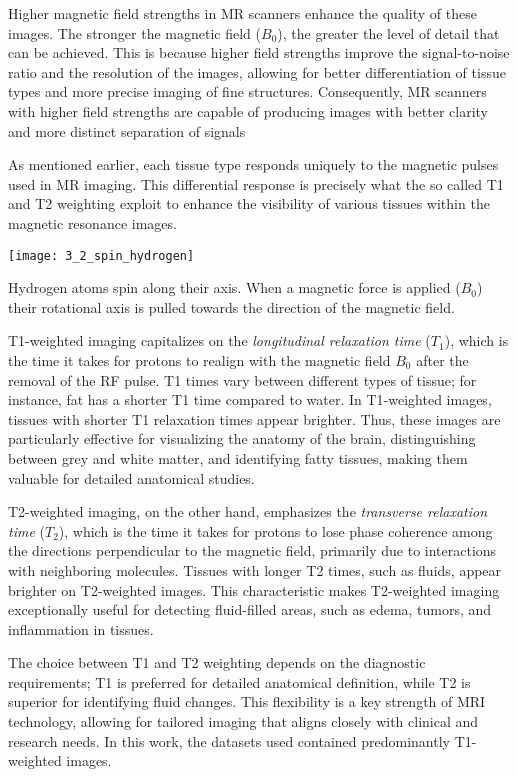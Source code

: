 Higher magnetic field strengths in MR scanners enhance the quality of these
images. The stronger the magnetic field ($B_0$), the greater the level of detail
that can be achieved. This is because higher field strengths improve the
signal-to-noise ratio and the resolution of the images, allowing for better
differentiation of tissue types and more precise imaging of fine structures.
Consequently, MR scanners with higher field strengths are capable of producing
images with better clarity and more distinct separation of
signals

As mentioned earlier, each tissue type responds uniquely to the magnetic pulses
used in MR imaging. This differential response is precisely what the so called
T1 and T2 weighting exploit to enhance the visibility of various tissues within
the magnetic resonance images.
\begin{marginfigure}
    \texttt{[image: 3\_2\_spin\_hydrogen]}
    \caption[Spin of an Hydrogen Atom]{Hydrogen atoms spin along their axis.
    When a magnetic force is applied ($B_0$) their rotational axis is pulled
    towards the direction of the magnetic field.}
\end{marginfigure}
T1-weighted imaging capitalizes on the \emph{longitudinal relaxation time}
($T_1$), which is the time it takes for protons to realign with the magnetic
field $B_0$ after the removal of the RF pulse. T1 times vary between different
types of tissue; for instance, fat has a shorter T1 time compared to water. In
T1-weighted images, tissues with shorter T1 relaxation times appear brighter.
Thus, these images are particularly effective for visualizing the anatomy of the
brain, distinguishing between grey and white matter, and identifying fatty
tissues, making them valuable for detailed anatomical studies.

T2-weighted imaging, on the other hand, emphasizes the \emph{transverse
relaxation time} ($T_2$), which is the time it takes for protons to lose phase
coherence among the directions perpendicular to the magnetic field, primarily
due to interactions with neighboring molecules. Tissues with longer T2 times,
such as fluids, appear brighter on T2-weighted images. This characteristic makes
T2-weighted imaging exceptionally useful for detecting fluid-filled areas, such
as edema, tumors, and inflammation in tissues.

The choice between T1 and T2 weighting depends on the diagnostic requirements;
T1 is preferred for detailed anatomical definition, while T2 is superior for
identifying fluid changes. This flexibility is a key strength of MRI technology,
allowing for tailored imaging that aligns closely with clinical and research
needs. In this work, the datasets used contained predominantly T1-weighted
images. 

